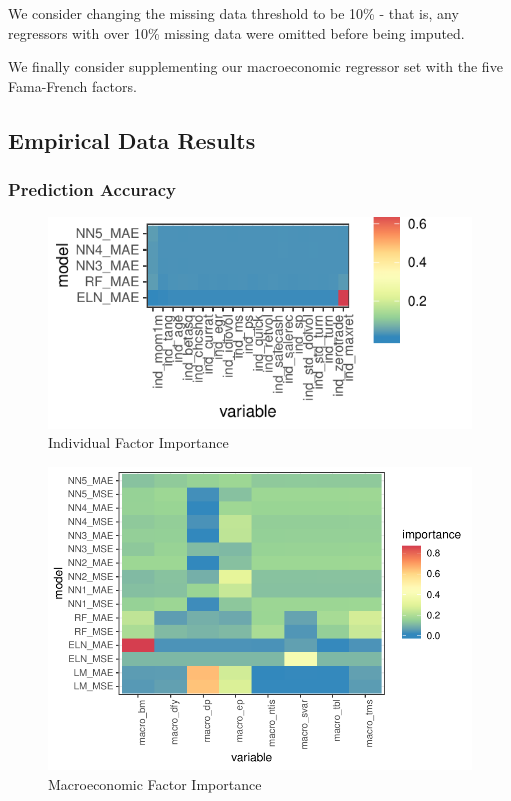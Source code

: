 \documentclass{article}
\begin{document}
We consider changing the missing data threshold to be 10\% - that is, any regressors with over 10\% missing data were omitted before being imputed.

We finally consider supplementing our macroeconomic regressor set with the five Fama-French factors. 

\subsection{Empirical Data Results}


\subsubsection{Prediction Accuracy}



\begin{figure}
	\includegraphics[]{../../Results/empirical/empirical_all_sample_vi_ind.pdf}
	\caption{Individual Factor Importance}
\end{figure}

\begin{figure}
	\includegraphics[]{../../Results/empirical/empirical_sample_all_vi_macro.pdf}
	\caption{Macroeconomic Factor Importance}
\end{figure}
\end{document}
